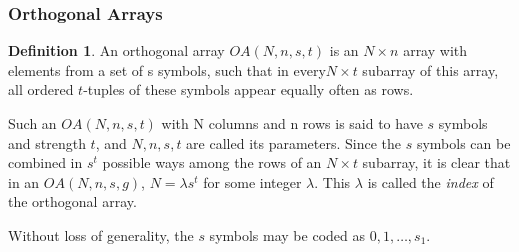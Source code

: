 \documentclass[12pt]{article}
\theoremstyle{definition}
\newtheorem{defn}{Definition}
\newenvironment{definition}{
\begin{tcolorbox}[colback=green!5!white,colframe=green!75!black, parbox = false]\begin{defn} }{\end{defn}\end{tcolorbox} }
\begin{document}
\subsubsection{Orthogonal Arrays}

\begin{definition}
    An orthogonal array $OA(N, n, s, t)$ is an $N \times n$ array with elements from a set of s symbols, such that in every$ N \times t$ subarray of this array,  all ordered $t$-tuples of these symbols appear equally often as rows.
\end{definition}

Such an $OA(N, n, s,t)$ with N columns and n rows is said to have $s$ symbols and strength $t$, and $N, n, s, t$  are called its parameters.  
Since the $s$ symbols can be combined in $s^t$ possible ways among the rows of
an $N\times  t$ subarray, it is clear that in an $OA(N, n, s, g)$, $N=\lambda s^t$ for some integer $\lambda$. This $\lambda$ is called the \textit{index} of the orthogonal array.

Without loss of generality, the $s$ symbols may be coded as $0, 1, \ldots , s_1$. 
\end{document}

